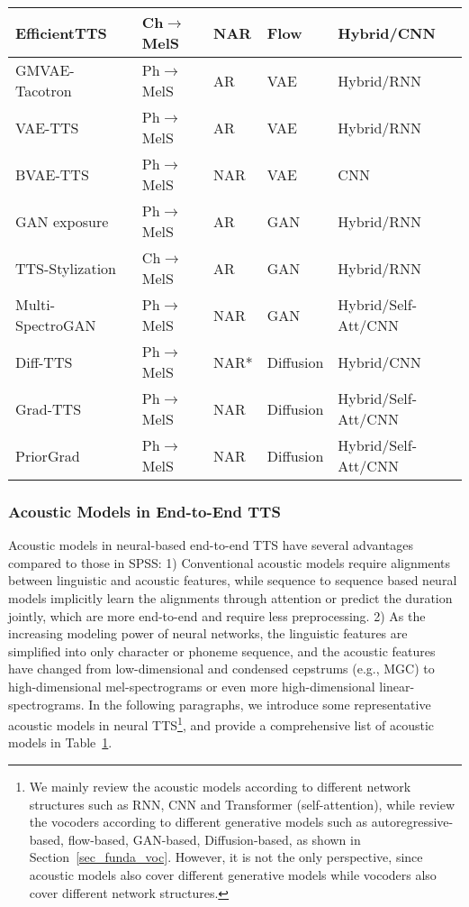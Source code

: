 \documentclass{article}
\begin{document}
\begin{table}[h!]
\begin{tabular}{l | l l l l }
        EfficientTTS~\cite{miao2020efficienttts} & Ch$\rightarrow$MelS & NAR & Flow & Hybrid/CNN  \\
        \midrule
        GMVAE-Tacotron~\cite{hsu2018hierarchical} & Ph$\rightarrow$MelS & AR & VAE &  Hybrid/RNN \\
        VAE-TTS~\cite{zhang2019learningb} & Ph$\rightarrow$MelS & AR & VAE &  Hybrid/RNN \\
        BVAE-TTS~\cite{lee2020bidirectional} & Ph$\rightarrow$MelS & NAR & VAE &  CNN \\
        \midrule
        GAN exposure~\cite{guo2019new} & Ph$\rightarrow$MelS & AR & GAN &  Hybrid/RNN \\
        TTS-Stylization~\cite{ma2018neural} & Ch$\rightarrow$MelS & AR & GAN &  Hybrid/RNN \\
        Multi-SpectroGAN~\cite{lee2020multi} & Ph$\rightarrow$MelS & NAR & GAN &  Hybrid/Self-Att/CNN \\
        \midrule
        Diff-TTS~\cite{jeong2021diff} & Ph$\rightarrow$MelS & NAR* & Diffusion &  Hybrid/CNN \\
        Grad-TTS~\cite{popov2021grad} & Ph$\rightarrow$MelS & NAR & Diffusion &  Hybrid/Self-Att/CNN \\
        PriorGrad~\cite{lee2021priorgrad} & Ph$\rightarrow$MelS & NAR & Diffusion &  Hybrid/Self-Att/CNN \\
        \bottomrule
	\end{tabular}
	\vspace{0.3cm}
	\label{tab_am_summary}
\end{table}


\subsubsection{Acoustic Models in End-to-End TTS} 
Acoustic models in neural-based end-to-end TTS have several advantages compared to those in SPSS: 1) Conventional acoustic models require alignments between linguistic and acoustic features, while sequence to sequence based neural models implicitly learn the alignments through attention or predict the duration jointly, which are more end-to-end and require less preprocessing. 2) As the increasing modeling power of neural networks, the linguistic features are simplified into only character or phoneme sequence, and the acoustic features have changed from low-dimensional and condensed cepstrums (e.g., MGC) to high-dimensional mel-spectrograms or even more high-dimensional linear-spectrograms. In the following paragraphs, we introduce some representative acoustic models in neural TTS\footnote{We mainly review the acoustic models according to different network structures such as RNN, CNN and Transformer (self-attention), while review the vocoders according to different generative models such as autoregressive-based, flow-based, GAN-based, Diffusion-based, as shown in Section~\ref{sec_funda_voc}. However, it is not the only perspective, since acoustic models also cover different generative models while vocoders also cover different network structures.}, and provide a comprehensive list of acoustic models in Table~\ref{tab_am_summary}.  
\end{document}
